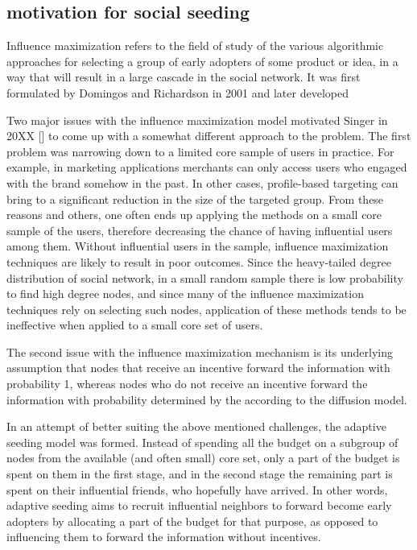 \subsection{motivation for social seeding}



Influence maximization refers to the field of study of the various algorithmic
 approaches for selecting a group of early adopters of some product or idea,
 in a way that will result in a large cascade in the social network.
 It was first formulated by Domingos and Richardson in 2001 and later developed




Two major issues with the influence maximization model motivated Singer
 in 20XX [] to come up with a somewhat different approach to the problem.
 The first problem was narrowing down to a limited core sample of users
 in practice.
 For example, in marketing applications merchants can only access users
 who engaged with the brand somehow in the past.
 In other cases, profile-based targeting can bring to a significant reduction
 in the size of the targeted group.
 From these reasons and others, one often ends up applying the methods on
 a small core sample of the users, therefore decreasing the chance of having
 influential users among them.
 Without influential users in the sample, influence maximization techniques
 are likely to result in poor outcomes.
 Since the heavy-tailed degree distribution of social network, in a small
 random sample there is low probability to find high degree nodes, and since
 many of the influence maximization techniques rely on selecting such nodes,
 application of these methods tends to be ineffective when applied to a
 small core set of users.

The second issue with the influence maximization mechanism is its underlying
 assumption that nodes that receive an incentive forward the information
 with probability 1, whereas nodes who do not receive an incentive forward
 the information with probability determined by the according to the diffusion
 model.

In an attempt of better suiting the above mentioned challenges, the adaptive
 seeding model was formed.
 Instead of spending all the budget on a subgroup of nodes from the available
 (and often small) core set, only a part of the budget is spent on them
 in the first stage, and in the second stage the remaining part is spent
 on their influential friends, who hopefully have arrived.
 In other words, adaptive seeding aims to recruit influential neighbors
 to forward become early adopters by allocating a part of the budget for
 that purpose, as opposed to influencing them to forward the information
 without incentives.

